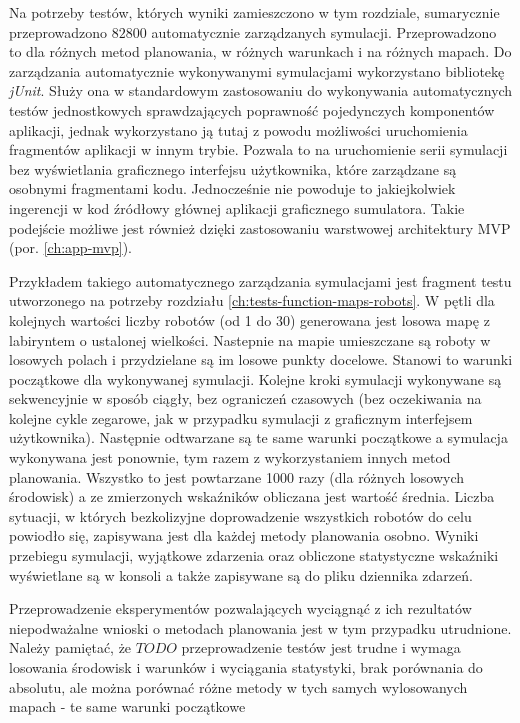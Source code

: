 Na potrzeby testów, których wyniki zamieszczono w tym rozdziale, sumarycznie przeprowadzono $82 800$ automatycznie zarządzanych symulacji. Przeprowadzono to dla różnych metod planowania, w różnych warunkach i na różnych mapach.
Do zarządzania automatycznie wykonywanymi symulacjami wykorzystano bibliotekę {\it jUnit}. Służy ona w standardowym zastosowaniu do wykonywania automatycznych testów jednostkowych sprawdzających poprawność pojedynczych komponentów aplikacji, jednak wykorzystano ją tutaj z powodu możliwości uruchomienia fragmentów aplikacji w innym trybie. Pozwala to na uruchomienie serii symulacji bez wyświetlania graficznego interfejsu użytkownika, które zarządzane są osobnymi fragmentami kodu. Jednocześnie nie powoduje to jakiejkolwiek ingerencji w kod źródłowy głównej aplikacji graficznego sumulatora.
Takie podejście możliwe jest również dzięki zastosowaniu warstwowej architektury MVP (por. \ref{ch:app-mvp}).

Przykładem takiego automatycznego zarządzania symulacjami jest fragment testu utworzonego na potrzeby rozdziału \ref{ch:tests-function-maps-robots}. W pętli dla kolejnych wartości liczby robotów (od 1 do 30) generowana jest losowa mapę z labiryntem o ustalonej wielkości. Nastepnie na mapie umieszczane są roboty w losowych polach i przydzielane są im losowe punkty docelowe. Stanowi to warunki początkowe dla wykonywanej symulacji. Kolejne kroki symulacji wykonywane są sekwencyjnie w sposób ciągły, bez ograniczeń czasowych (bez oczekiwania na kolejne cykle zegarowe, jak w przypadku symulacji z graficznym interfejsem użytkownika). Następnie odtwarzane są te same warunki początkowe a symulacja wykonywana jest ponownie, tym razem z wykorzystaniem innych metod planowania. Wszystko to jest powtarzane 1000 razy (dla różnych losowych środowisk) a ze zmierzonych wskaźników obliczana jest wartość średnia. Liczba sytuacji, w których bezkolizyjne doprowadzenie wszystkich robotów do celu powiodło się, zapisywana jest dla każdej metody planowania osobno.
Wyniki przebiegu symulacji, wyjątkowe zdarzenia oraz obliczone statystyczne wskaźniki wyświetlane są w konsoli a także zapisywane są do pliku dziennika zdarzeń.

Przeprowadzenie eksperymentów pozwalających wyciągnąć z ich rezultatów niepodważalne wnioski o metodach planowania jest w tym przypadku utrudnione.
Należy pamiętać, że 
$TODO$
przeprowadzenie testów jest trudne i wymaga losowania środowisk i warunków i wyciągania statystyki, brak porównania do absolutu, ale można porównać różne metody w tych samych wylosowanych mapach - te same warunki początkowe

